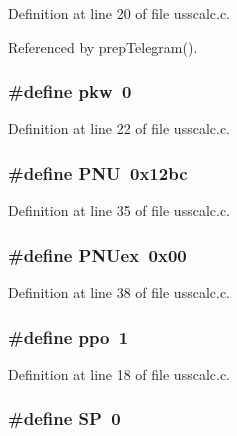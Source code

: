 Definition at line 20 of file usscalc.\+c.



Referenced by prep\+Telegram().

\subsubsection[{pkw}]{\setlength{\rightskip}{0pt plus 5cm}\#define pkw~0}\label{usscalc_8c_a0b9a09dbc3e3871baf2f518b82686dcb}


Definition at line 22 of file usscalc.\+c.

\subsubsection[{P\+N\+U}]{\setlength{\rightskip}{0pt plus 5cm}\#define P\+N\+U~0x12bc}\label{usscalc_8c_ab765f8aafdcbbd05cfcd27e208eb55b2}


Definition at line 35 of file usscalc.\+c.

\subsubsection[{P\+N\+Uex}]{\setlength{\rightskip}{0pt plus 5cm}\#define P\+N\+Uex~0x00}\label{usscalc_8c_a544eab7def9683a65c07c12fb091acc7}


Definition at line 38 of file usscalc.\+c.

\subsubsection[{ppo}]{\setlength{\rightskip}{0pt plus 5cm}\#define ppo~1}\label{usscalc_8c_a8ef3f4ce9afc84a8f4b4c62237ad2dcb}


Definition at line 18 of file usscalc.\+c.

\subsubsection[{S\+P}]{\setlength{\rightskip}{0pt plus 5cm}\#define S\+P~0}\label{usscalc_8c_aecd69d9a67487cc45c38eb184c50538a}


